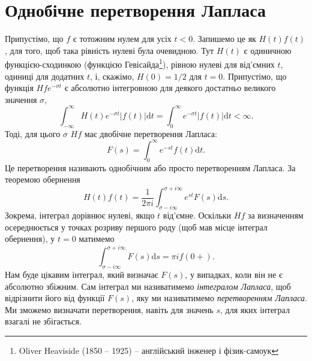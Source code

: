 \documentclass[14pt,twoside]{extreport}
\theoremstyle{mystyle}
\numberwithin{equation}{chapter}
\begin{document}
%
%

\section{Однобічне перетворення Лапласа}

Припустімо, що $f$ є тотожним нулем для усіх $t<0$. Запишемо це як $H(t)f(t)$, для того, щоб така рівність нулеві була очевидною. Тут $H(t)$ є одиничною функцією-сходинкою (функцією Гевісайда\footnote{Oliver Heaviside (1850 -- 1925) -- англійський інженер і фізик-самоук}), рівною нулеві для від'ємних $t$, одиниці для додатних $t$, і, скажімо, $H(0)=1/2$ для $t=0$. Припустімо, що функція $Hfe^{-\sigma t}$ є абсолютно інтегровною для деякого достатньо великого значення $\sigma$,
\begin{equation*}
	\displaystyle \int_{-\infty}^{\infty}H(t)e^{-\sigma t}|f(t)|\mathrm{d}t=\int_{0}^{\infty}e^{-\sigma t}|f(t)|\mathrm{d}t<\infty.
\end{equation*}
Тоді, для цього $\sigma$ $Hf$ має двобічне перетворення Лапласа:
\begin{equation*}
	\displaystyle F(s)=\int_{0}^{\infty}e^{-st}f(t)\mathrm{d}t.
\end{equation*}
Це перетворення називають однобічним або просто перетворенням Лапласа. За теоремою обернення
\begin{equation*}
	H(t)f(t)=\dfrac{1}{2 \pi i}\int_{\sigma-i\infty}^{\sigma+i\infty}e^{st}F(s)\mathrm{d}s.
\end{equation*}
Зокрема, інтеграл дорівнює нулеві, якщо $t$ від'ємне. Оскільки $Hf$ за визначенням осереднюється у точках розриву першого роду (щоб мав місце інтеграл обернення), у $t=0$ матимемо
\begin{equation*}
	\displaystyle \int_{\sigma-i\infty}^{\sigma+i\infty}F(s)\mathrm{d}s=\pi if(0+).
\end{equation*}
Нам буде цікавим інтеграл, який визначає $F(s)$, у випадках, коли він не є абсолютно збіжним. Сам інтеграл ми називатимемо \emph{інтегралом Лапласа}, щоб відрізнити його від функції $F(s)$, яку ми називатимемо \emph{перетворенням Лапласа}. Ми зможемо визначати перетворення, навіть для значень $s$, для яких інтеграл взагалі не збігається.
\end{document}
